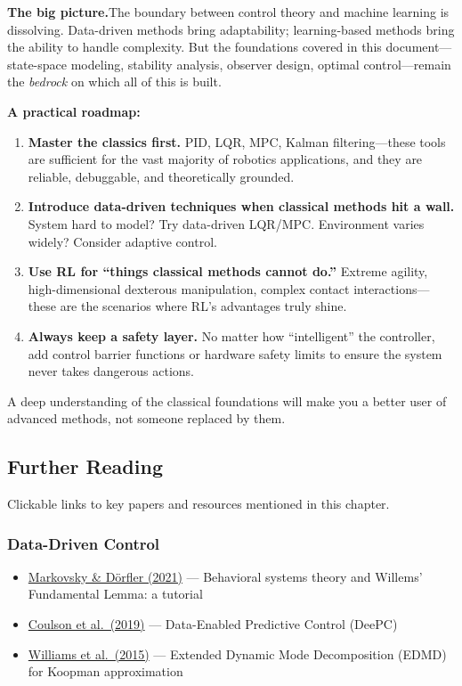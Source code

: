 \begin{mdframed}
\textbf{The big picture.}\;The boundary between control theory and machine learning is dissolving. Data-driven methods bring adaptability; learning-based methods bring the ability to handle complexity. But the foundations covered in this document---state-space modeling, stability analysis, observer design, optimal control---remain the \emph{bedrock} on which all of this is built.

\textbf{A practical roadmap:}
\begin{enumerate}[nosep]
    \item \textbf{Master the classics first.} PID, LQR, MPC, Kalman filtering---these tools are sufficient for the vast majority of robotics applications, and they are reliable, debuggable, and theoretically grounded.
    \item \textbf{Introduce data-driven techniques when classical methods hit a wall.} System hard to model? Try data-driven LQR/MPC. Environment varies widely? Consider adaptive control.
    \item \textbf{Use RL for ``things classical methods cannot do.''} Extreme agility, high-dimensional dexterous manipulation, complex contact interactions---these are the scenarios where RL's advantages truly shine.
    \item \textbf{Always keep a safety layer.} No matter how ``intelligent'' the controller, add control barrier functions or hardware safety limits to ensure the system never takes dangerous actions.
\end{enumerate}

A deep understanding of the classical foundations will make you a better user of advanced methods, not someone replaced by them.
\end{mdframed}

\subsection{Further Reading}

Clickable links to key papers and resources mentioned in this chapter.

\subsubsection*{Data-Driven Control}
\begin{itemize}[nosep]
    \item \href{https://arxiv.org/abs/2206.00397}{Markovsky \& Dörfler (2021)} --- Behavioral systems theory and Willems' Fundamental Lemma: a tutorial
    \item \href{https://arxiv.org/abs/1811.05890}{Coulson et al.\ (2019)} --- Data-Enabled Predictive Control (DeePC)
    \item \href{https://arxiv.org/abs/1408.4408}{Williams et al.\ (2015)} --- Extended Dynamic Mode Decomposition (EDMD) for Koopman approximation
\end{itemize}

